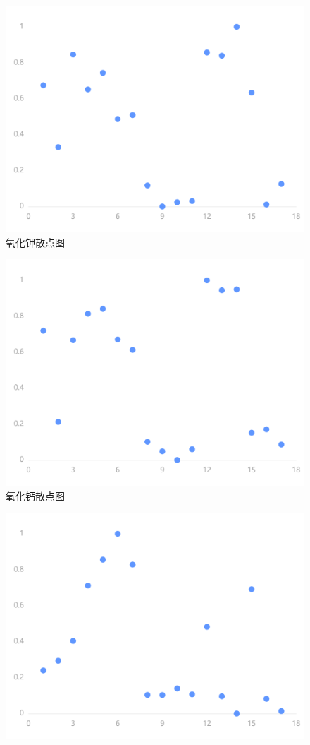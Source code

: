 \documentclass[UTF8]{ctexart}
\begin{document}
\begin{figure}[H]\centering
    \includegraphics[width=1\textwidth,height=0.6\textwidth]{img/2.png} %
    \caption{氧化钾散点图} %
\end{figure}\begin{figure}[H]\centering
    \includegraphics[width=1\textwidth,height=0.6\textwidth]{img/3.png} %
    \caption{氧化钙散点图} %
\end{figure}\begin{figure}[H]\centering
    \includegraphics[width=1\textwidth,height=0.6\textwidth]{img/4.png} %

\end{figure}
\end{document}
